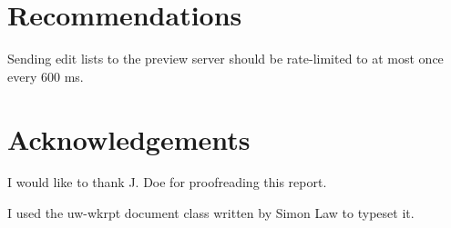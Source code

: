 \documentclass[se,resubmit]{uw-wkrpt}
\begin{document}
\section{Recommendations}
Sending edit lists to the preview server should be rate-limited to at most once
every 600 ms.

\backmatter

%
\printbibliography[heading=bibintoc]

\section{Acknowledgements}
I would like to thank J. Doe for proofreading this report.

I used the \textsf{uw-wkrpt} document class written by Simon Law to 
typeset it.
\end{document}
